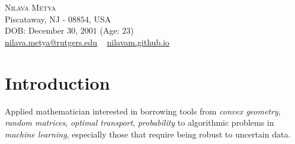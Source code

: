 
\usepackage{tabto}
\usepackage{setspace}
\usepackage{etaremune}
\usepackage{comment}
\usepackage{xcolor}
\newcommand*\circled[1]{\tikz[baseline=(char.base)]{
            \node[shape=circle,draw,inner sep=1pt, line width=1.1pt] (char) {#1};}}





\begin{center}
    {\Huge \scshape Nilava Metya} \\ \vspace{1pt}
    Piscataway, NJ - $08854$, USA\\
    DOB: December $30$, $2001$ (Age: $23$)\\ \vspace{1pt}
{\small 
\href{mailto:nilava.metya@rutgers.edu}{\circled{\scriptsize\faEnvelope}  \underline{nilava.metya@rutgers.edu}} ~ 
{\circled{\scriptsize\faHome} \underline{\url{nilavam.github.io}}}}
\end{center}




\section{Introduction}
Applied mathematician interested in borrowing tools from \textit{convex geometry}, \textit{random matrices}, \textit{optimal transport}, \textit{probability} to algorithmic problems in \textit{machine learning}, especially those that require being robust to uncertain data.
\vspace{\gap}
